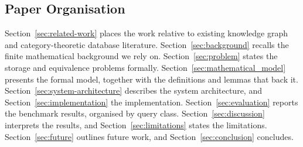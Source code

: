 \subsection*{Paper Organisation}
\label{sec:organization}

Section~\ref{sec:related-work} places the work relative to existing knowledge
graph and category-theoretic database literature. Section~\ref{sec:background}
recalls the finite mathematical background we rely on. Section~\ref{sec:problem}
states the storage and equivalence problems formally.
Section~\ref{sec:mathematical_model} presents the formal model, together
with the definitions and lemmas that back it.
Section~\ref{sec:system-architecture} describes the system architecture, and
Section~\ref{sec:implementation} the implementation. Section~\ref{sec:evaluation}
reports the benchmark results, organised by query class.
Section~\ref{sec:discussion} interprets the results, and
Section~\ref{sec:limitations} states the limitations. Section~\ref{sec:future}
outlines future work, and Section~\ref{sec:conclusion} concludes.

